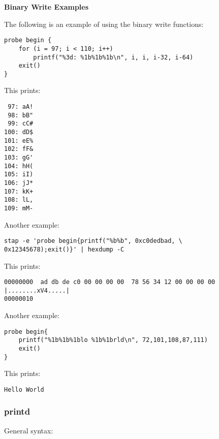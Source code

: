 \documentclass[twoside,english]{article}
\newenvironment{vindent}
{\begin{list}{}{\setlength{\listparindent}{6pt}}
\item[]}
{\end{list}}
\begin{document}
\textbf{Binary Write Examples}

The following is an example of using the binary write functions:

\begin{vindent}
\begin{verbatim}
probe begin {
    for (i = 97; i < 110; i++)
        printf("%3d: %1b%1b%1b\n", i, i, i-32, i-64)
    exit()
}
\end{verbatim}
\end{vindent}
This prints:

\begin{vindent}
\begin{verbatim}
 97: aA!
 98: bB"
 99: cC#
100: dD$
101: eE%
102: fF&
103: gG'
104: hH(
105: iI)
106: jJ*
107: kK+
108: lL,
109: mM-
\end{verbatim}
\end{vindent}
Another example:

\begin{vindent}
\begin{verbatim}
stap -e 'probe begin{printf("%b%b", 0xc0dedbad, \
0x12345678);exit()}' | hexdump -C

\end{verbatim}
\end{vindent}
This prints:

\begin{vindent}
\begin{verbatim}
00000000  ad db de c0 00 00 00 00  78 56 34 12 00 00 00 00  |........xV4.....|
00000010
\end{verbatim}
\end{vindent}
Another example:

\begin{vindent}
\begin{verbatim}
probe begin{
    printf("%1b%1b%1blo %1b%1brld\n", 72,101,108,87,111)
    exit()
}
\end{verbatim}
\end{vindent}
This prints:

\begin{vindent}
\begin{verbatim}
Hello World
\end{verbatim}
\end{vindent}

\subsubsection{printd}
General syntax:
\end{document}
